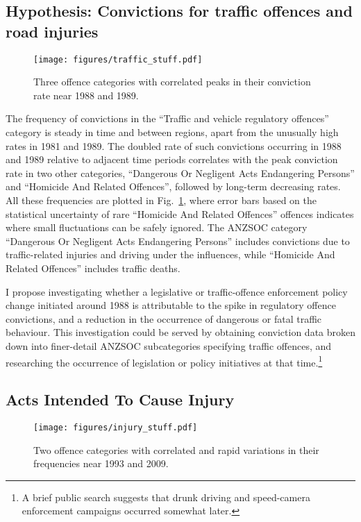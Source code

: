 \documentclass[onecolumn]{myarticle}
\begin{document}
\subsection*{Hypothesis: Convictions for traffic offences and road injuries}

\begin{figure}
  \centering
  \texttt{[image: figures/traffic\_stuff.pdf]}
  \caption{Three offence categories with correlated peaks in their conviction rate near 1988 and 1989.}
  \label{fig:traffic stuff}
\end{figure}


The frequency of convictions in the ``Traffic and vehicle regulatory offences'' category is steady in time and between regions, apart from the unusually high rates in 1981 and 1989. 
The doubled rate of such convictions occurring in 1988 and 1989 relative to adjacent time periods correlates with the peak conviction rate in two other categories, ``Dangerous Or Negligent Acts Endangering Persons'' and ``Homicide And Related Offences'', followed by long-term decreasing rates.
All these frequencies are plotted in Fig.~\ref{fig:traffic stuff}, where error bars based on the statistical uncertainty of rare ``Homicide And Related Offences'' offences indicates where small fluctuations can be safely ignored.
The ANZSOC category ``Dangerous Or Negligent Acts Endangering Persons'' includes convictions due to traffic-related injuries and driving under the influences, while ``Homicide And Related Offences'' includes traffic deaths.  

I propose investigating whether a legislative or traffic-offence enforcement policy change initiated around 1988 is attributable to the spike in regulatory offence convictions, and a reduction in the occurrence of dangerous or fatal traffic behaviour.
This investigation could be served by obtaining conviction data broken down into finer-detail ANZSOC subcategories specifying traffic offences, and researching the occurrence of legislation or policy initiatives at that time.\footnote{A brief public search suggests that drunk driving and speed-camera enforcement campaigns occurred somewhat later.}

\subsection*{Acts Intended To Cause Injury}

\begin{figure}
  \centering
  \texttt{[image: figures/injury\_stuff.pdf]}
  \caption{Two offence categories with correlated and rapid variations in their frequencies near 1993 and 2009.}
  \label{fig:injury stuff}
\end{figure}
\end{document}

